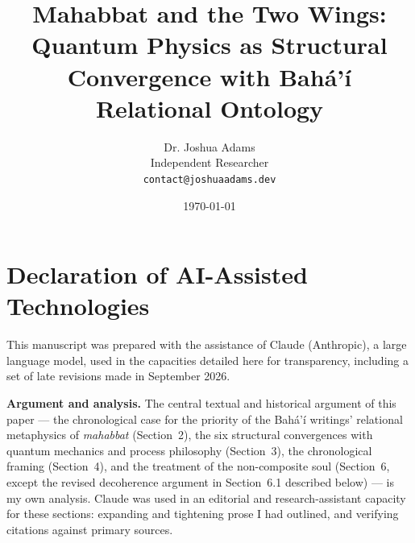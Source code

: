 \documentclass[12pt, a4paper]{article}
\begin{document}

\title{Mahabbat and the Two Wings: Quantum Physics as Structural\\
       Convergence with Bahá'í Relational Ontology}

\author{Dr. Joshua Adams \\
        \small Independent Researcher\\
        \small \texttt{contact@joshuaadams.dev}}

\date{\today}

\maketitle

\begin{abstract}

\end{abstract}

\newpage
\tableofcontents
\newpage







\newpage

\section*{Declaration of AI-Assisted Technologies}

This manuscript was prepared with the assistance of Claude (Anthropic), a large language
model, used in the capacities detailed here for transparency, including a set of late
revisions made in September 2026.

\textbf{Argument and analysis.} The central textual and historical argument of this
paper --- the chronological case for the priority of the Bahá'í writings' relational
metaphysics of \emph{mahabbat} (Section~2), the six structural convergences with quantum
mechanics and process philosophy (Section~3), the chronological framing (Section~4), and
the treatment of the non-composite soul (Section~6, except the revised decoherence
argument in Section~6.1 described below) --- is my own analysis. Claude was used in an editorial and research-assistant
capacity for these sections: expanding and tightening prose I had outlined, and verifying
citations against primary sources.
\end{document}
